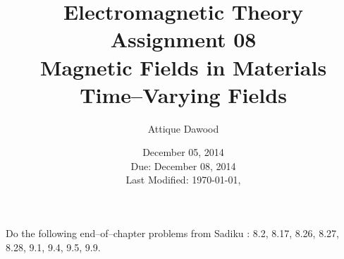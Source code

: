 \documentclass[12pt,a4paper]{article}
\title{Electromagnetic Theory\\Assignment 08\\Magnetic Fields in Materials\\Time--Varying Fields}
\author{Attique Dawood}
\date{December 05, 2014\\Due: December 08, 2014\\[0.2cm] Last Modified: \today, \currenttime}
\begin{document}
\maketitle
Do the following end--of--chapter problems from Sadiku \cite[Page 362--363 and 404--405]{Sadiku}: 8.2, 8.17, 8.26, 8.27, 8.28, 9.1, 9.4, 9.5, 9.9.


\end{document}
